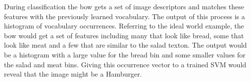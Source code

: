 During classification the \gls{bow} gets a set of image descriptors and matches these features with the previously learned vocabulary. The output of this process is a histogram of vocabulary occurrences. Referring to the ideal world example, the \gls{bow} would get a set of features including many that look like bread, some that look like meat and a few that are similar to the salad texton. The output would be a histogram with a large value for the bread bin and some smaller values for the salad and meat bins. Giving this occurrence vector to a trained SVM would reveal that the image might be a Hamburger.






